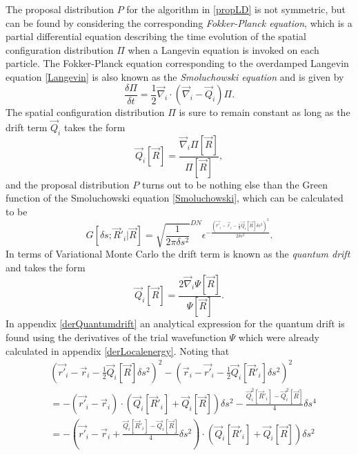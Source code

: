 \documentclass[a4paper,8pt]{article}
\begin{document}
\begin{multicols}{2}
The proposal distribution $P$ for the algorithm in \eqref{propLD} is not symmetric, but can be found by considering the corresponding \textit{Fokker-Planck equation}, which is a partial differential equation describing the time evolution of the spatial configuration distribution $\Pi$ when a Langevin equation is invoked on each particle. The Fokker-Planck equation corresponding to the overdamped Langevin equation \eqref{Langevin} is also known as the \textit{Smoluchowski equation} and is given by
\begin{equation}\label{Smoluchowski}
\frac{\delta\Pi}{\delta t} = \frac{1}{2}\vec{\nabla}_i\cdot\left(\vec{\nabla}_i-\vec{Q}_i\right)\Pi.
\end{equation}
The spatial configuration distribution $\Pi$ is sure to remain constant as long as the drift term $\vec{Q}_i$ takes the form
\begin{equation}
\vec{Q}_i[\vec{R}] = \frac{\vec{\nabla}_i\Pi[\vec{R}]}{\Pi[\vec{R}]},
\end{equation}
and the proposal distribution $P$ turns out to be nothing else than the Green function of the Smoluchowski equation \eqref{Smoluchowski}, which can be calculated to be
\begin{equation}\label{Green}
G[\delta s; \vec{R}'_i|\vec{R}] = \sqrt{\frac{1}{2\pi \delta s^2}}^{DN} \epsilon^{-\frac{\left(\vec{r'}_i-\vec{r}_i-\frac{1}{2}\vec{Q}_i[\vec{R}]\delta s^2\right)^2}{2\delta s^2}}.
\end{equation}
In terms of Variational Monte Carlo the drift term is known as the \textit{quantum drift} and takes the form
\begin{equation}\label{quantumdrift}
\vec{Q}_i[\vec{R}] = \frac{2\vec{\nabla}_i\Psi[\vec{R}]}{\Psi[\vec{R}]}.
\end{equation}
In appendix \ref{derQuantumdrift} an analytical expression for the quantum drift is found using the derivatives of the trial wavefunction $\Psi$ which were already calculated in appendix \ref{derLocalenergy}. Noting that
{\small\begin{align}
&\left(\vec{r'}_i-\vec{r}_i-\frac{1}{2}\vec{Q}_i[\vec{R}]\delta s^2 \right)^2-\left(\vec{r}_i-\vec{r'}_i-\frac{1}{2}\vec{Q}_i[\vec{R}'_i]\delta s^2\right)^2 \nonumber\\
&= -\left(\vec{r'}_i-\vec{r}_i\right) \cdot \left(\vec{Q}_i[\vec{R}'_i]+\vec{Q}_i[\vec{R}]\right)\delta s^2-\frac{\vec{Q}_i^2[\vec{R}'_i]-\vec{Q}_i^2[\vec{R}]}{4}\delta s^4 \nonumber\\
&= -\left(\vec{r'}_i-\vec{r}_i+\frac{\vec{Q}_i[\vec{R}'_i]-\vec{Q}_i[\vec{R}]}{4}\delta s^2\right)\cdot\left(\vec{Q}_i[\vec{R}'_i]+\vec{Q}_i[\vec{R}]\right)\delta s^2 \nonumber

\end{align}}
\end{multicols}
\end{document}

